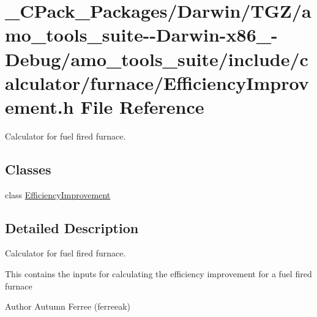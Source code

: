 \hypertarget{___c_pack___packages_2_darwin_2_t_g_z_2amo__tools__suite--_darwin-x86__64-_debug_2amo__tools__su1d89161e127170946bb50565191fbb80}{}\section{\+\_\+\+C\+Pack\+\_\+\+Packages/\+Darwin/\+T\+G\+Z/amo\+\_\+tools\+\_\+suite-\/-\/\+Darwin-\/x86\+\_-\/\+Debug/amo\+\_\+tools\+\_\+suite/include/calculator/furnace/\+Efficiency\+Improvement.h File Reference}
\label{___c_pack___packages_2_darwin_2_t_g_z_2amo__tools__suite--_darwin-x86__64-_debug_2amo__tools__su1d89161e127170946bb50565191fbb80}


Calculator for fuel fired furnace.  


\subsection*{Classes}
\begin{DoxyCompactItemize}
\item 
class \hyperlink{class_efficiency_improvement}{Efficiency\+Improvement}
\end{DoxyCompactItemize}


\subsection{Detailed Description}
Calculator for fuel fired furnace. 

This contains the inputs for calculating the efficiency improvement for a fuel fired furnace

\begin{DoxyAuthor}{Author}
Autumn Ferree (ferreeak) 
\end{DoxyAuthor}
